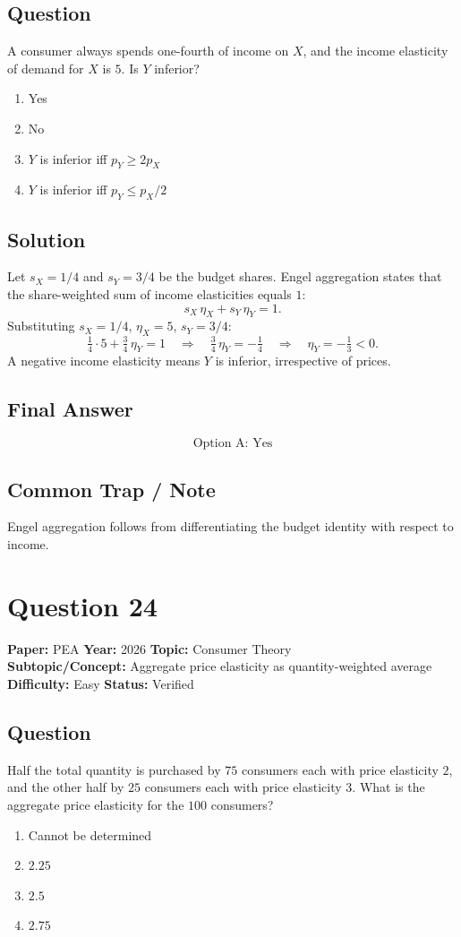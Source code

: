 \documentclass[11pt]{article}
\begin{document}
\subsection*{Question}
A consumer always spends one-fourth of income on $X$, and the income elasticity of demand for $X$ is $5$. Is $Y$ inferior?
\begin{enumerate}[label=(\Alph*)]
\item Yes \item No
\item $Y$ is inferior iff $p_Y \ge 2 p_X$
\item $Y$ is inferior iff $p_Y \le p_X/2$
\end{enumerate}

\subsection*{Solution}
Let $s_X = 1/4$ and $s_Y = 3/4$ be the budget shares. Engel aggregation states
that the share-weighted sum of income elasticities equals $1$:
\[
s_X\, \eta_X + s_Y\, \eta_Y = 1.
\]
Substituting $s_X = 1/4$, $\eta_X = 5$, $s_Y = 3/4$:
\[
\tfrac{1}{4}\cdot 5 + \tfrac{3}{4}\,\eta_Y = 1 \quad\Longrightarrow\quad
\tfrac{3}{4}\,\eta_Y = -\tfrac{1}{4} \quad\Longrightarrow\quad \eta_Y = -\tfrac{1}{3} < 0.
\]
A negative income elasticity means $Y$ is inferior, irrespective of prices.

\subsection*{Final Answer}
\[
\boxed{\text{Option A: Yes}}
\]

\subsection*{Common Trap / Note}
Engel aggregation follows from differentiating the budget identity with respect to income.

\section*{Question 24}
\textbf{Paper:} PEA \quad \textbf{Year:} 2026 \quad \textbf{Topic:} Consumer Theory \\
\textbf{Subtopic/Concept:} Aggregate price elasticity as quantity-weighted average \quad
\textbf{Difficulty:} Easy \quad \textbf{Status:} Verified

\subsection*{Question}
Half the total quantity is purchased by $75$ consumers each with price elasticity
$2$, and the other half by $25$ consumers each with price elasticity $3$. What is
the aggregate price elasticity for the $100$ consumers?
\begin{enumerate}[label=(\Alph*)]
\item Cannot be determined \item $2.25$ \item $2.5$ \item $2.75$
\end{enumerate}
\end{document}

